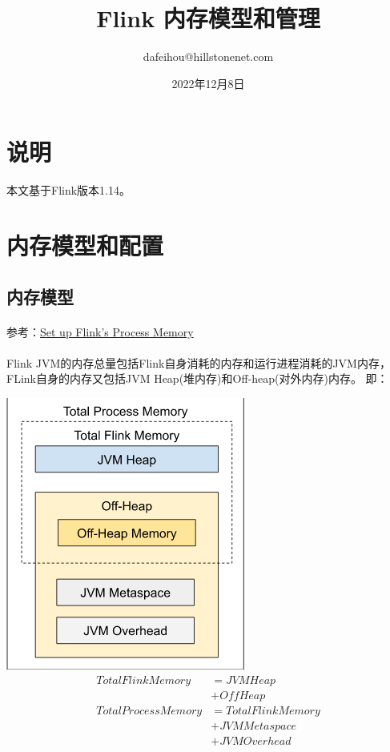 \documentclass[UTF8]{ctexart}
\title{Flink 内存模型和管理}
\author{dafeihou@hillstonenet.com}
\date{2022年12月8日}
\begin{document}
    \maketitle
    \section*{说明}
    本文基于Flink版本1.14。

    \newpage
    \section*{内存模型和配置}
    \subsection*{内存模型}
    \paragraph*{}
    参考：\href{https://nightlies.apache.org/flink/flink-docs-release-1.14/docs/deployment/memory/mem_setup/}{Set up Flink’s Process Memory}
    \paragraph*{}
    Flink JVM的内存总量包括Flink自身消耗的内存和运行进程消耗的JVM内存，FLink自身的内存又包括JVM Heap(堆内存)和Off-heap(对外内存)内存。
    \newline 即：

    \begin{minipage}[b]{1.0\linewidth}
        \centering
        \includegraphics[fbox]{total_memory_model.PNG}
        \label{fig.1}
        \begin{align*}
            TotalFlinkMemory &= JVMHeap\\ &+ OffHeap\\
            TotalProcessMemory &= TotalFlinkMemory\\ &+ JVMMetaspace\\ &+ JVMOverhead
        \end{align*}
    \end{minipage}
\end{document}
